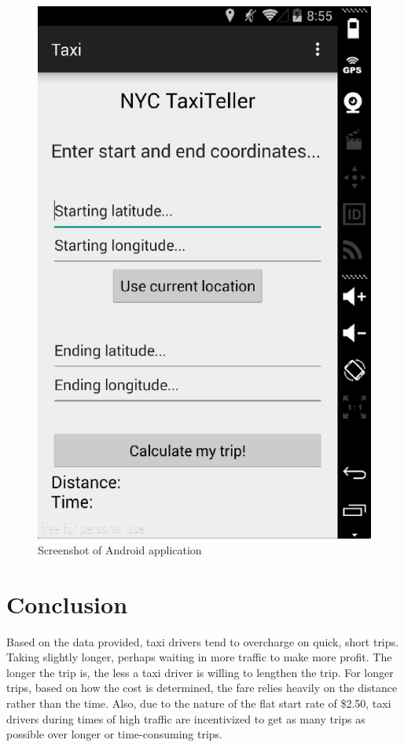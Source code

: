 \documentclass{sig-alternate}
\begin{document}
\begin{figure}
\includegraphics[scale=.30]{Screen_Shot_2015-04-16_at_3.eps}
\caption{Screenshot of Android application}
\end{figure}
\section{Conclusion}

Based on the data provided, taxi drivers tend to overcharge on quick, short trips. Taking slightly longer, perhaps waiting in more traffic to make more profit. The longer the trip is, the less a taxi driver is willing to lengthen the trip. For longer trips, based on how the cost is determined, the fare relies heavily on the distance rather than the time. Also, due to the nature of the flat start rate of \$2.50, taxi drivers during times of high traffic are incentivized to get as many trips as possible over longer or time-consuming trips.
\end{document}
